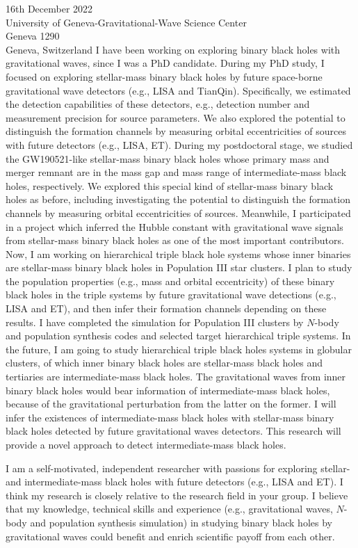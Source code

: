 \documentclass[11pt,a4paper,sans]{letter} %
\begin{document}
\begin{letter}{16th December 2022 \\
University of Geneva-Gravitational-Wave Science Center\\
Geneva 1290\\ 
Geneva, Switzerland}
I have been working on exploring binary black holes with gravitational waves, since I was a PhD
    candidate. During my PhD study, I focused on exploring stellar-mass binary black holes by future
    space-borne gravitational wave detectors (e.g., LISA and TianQin). Specifically, we estimated the detection
    capabilities of
    these detectors, e.g., detection number and measurement precision for source parameters. We also explored the
    potential to distinguish the formation channels by measuring orbital eccentricities of sources with future detectors
    (e.g., LISA, ET). During my postdoctoral
    stage, we studied the GW190521-like stellar-mass binary black holes whose primary mass and merger remnant are in the
    mass gap and mass range of 
    intermediate-mass black holes, respectively. We explored this special kind of stellar-mass binary black holes as
    before, including investigating the potential to distinguish the formation
    channels by measuring orbital eccentricities of sources. 
    Meanwhile, I participated
    in a project which inferred the Hubble
    constant with gravitational wave signals from stellar-mass binary black holes as one of the most important
    contributors. 
    Now, I am working on
    hierarchical triple
    black hole systems whose inner binaries are stellar-mass binary black holes in Population III star clusters. I plan to
    study the population properties (e.g., mass and orbital eccentricity) of these binary black holes in the triple systems by future gravitational wave
    detections (e.g., LISA and ET), and then
    infer their formation channels depending on these results. I have completed the simulation for Population III
    clusters by $N$-body and population synthesis codes and selected target hierarchical triple systems.  
    In the future, I am going to study hierarchical triple black holes systems in globular clusters, of which inner binary black holes are
    stellar-mass black holes and tertiaries are intermediate-mass black holes. The gravitational waves from inner binary
    black holes would bear information of intermediate-mass black holes, because of the gravitational perturbation from the
    latter on the former. I will infer the existences of
    intermediate-mass black holes with stellar-mass binary black holes detected by future gravitational waves detectors.
    This research will provide a novel approach to detect intermediate-mass black holes.

I am a self-motivated, independent researcher with
    passions for exploring stellar- and intermediate-mass black holes with future detectors (e.g., LISA and ET). I think
    my research is closely relative to the research field in your group. I believe that my knowledge,
    technical skills and experience (e.g., gravitational waves, $N$-body and population synthesis simulation) in studying binary black holes by
    gravitational waves could benefit and enrich scientific payoff
from each other. 


\end{letter}
\end{document}
